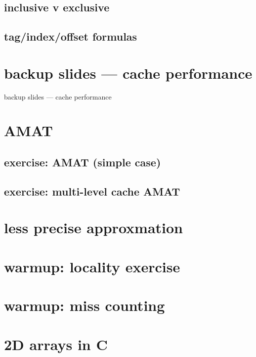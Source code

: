 \subsection{inclusive v exclusive}


\subsection{tag/index/offset formulas}


\section{backup slides --- cache performance}
\begin{frame}{backup slides --- cache performance}
\end{frame}

\section{AMAT}


\subsection{exercise: AMAT (simple case)}


\subsection{exercise: multi-level cache AMAT}


\section{less precise approxmation}


\section{warmup: locality exercise}  %


\section{warmup: miss counting}


\section{2D arrays in C}




